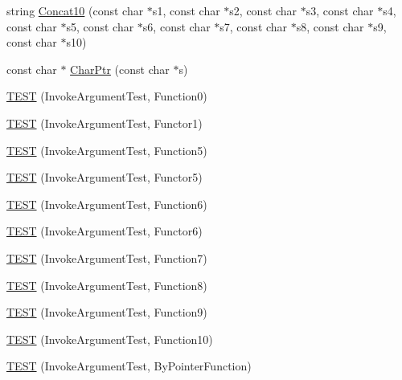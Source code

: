 \begin{DoxyCompactItemize}
string \hyperlink{namespacetesting_1_1gmock__generated__actions__test_ae90b9884fe6a44fa67c323c4f2f46d4f}{Concat10} (const char $\ast$s1, const char $\ast$s2, const char $\ast$s3, const char $\ast$s4, const char $\ast$s5, const char $\ast$s6, const char $\ast$s7, const char $\ast$s8, const char $\ast$s9, const char $\ast$s10)
\item 
const char $\ast$ \hyperlink{namespacetesting_1_1gmock__generated__actions__test_aa0f16da563ba1f4dd15c8a4fd9048fd3}{Char\+Ptr} (const char $\ast$s)
\item 
\hyperlink{namespacetesting_1_1gmock__generated__actions__test_aee4ab8d88ec59a7e3b91d919a6ed34da}{T\+E\+ST} (Invoke\+Argument\+Test, Function0)
\item 
\hyperlink{namespacetesting_1_1gmock__generated__actions__test_a47d12c8e504971d1f1c17df8d90bff82}{T\+E\+ST} (Invoke\+Argument\+Test, Functor1)
\item 
\hyperlink{namespacetesting_1_1gmock__generated__actions__test_a6afe3cf31ef3f5a9d6fd6af05c9de95c}{T\+E\+ST} (Invoke\+Argument\+Test, Function5)
\item 
\hyperlink{namespacetesting_1_1gmock__generated__actions__test_aab59917791fb297d6735d46e9a862be1}{T\+E\+ST} (Invoke\+Argument\+Test, Functor5)
\item 
\hyperlink{namespacetesting_1_1gmock__generated__actions__test_ae3f8bdac5c2ea1cf56ff1484ebb9a44e}{T\+E\+ST} (Invoke\+Argument\+Test, Function6)
\item 
\hyperlink{namespacetesting_1_1gmock__generated__actions__test_a789c7e8ee88243dc4a53841f6a8da3c6}{T\+E\+ST} (Invoke\+Argument\+Test, Functor6)
\item 
\hyperlink{namespacetesting_1_1gmock__generated__actions__test_a3e13c2ccf384c80c66116418e1b3ccde}{T\+E\+ST} (Invoke\+Argument\+Test, Function7)
\item 
\hyperlink{namespacetesting_1_1gmock__generated__actions__test_a5d583a32b46a306139d32ea9a1d575a9}{T\+E\+ST} (Invoke\+Argument\+Test, Function8)
\item 
\hyperlink{namespacetesting_1_1gmock__generated__actions__test_a3a278f02e1633feda3dea30d810a49ea}{T\+E\+ST} (Invoke\+Argument\+Test, Function9)
\item 
\hyperlink{namespacetesting_1_1gmock__generated__actions__test_afe4653b181e199417b004c4485152010}{T\+E\+ST} (Invoke\+Argument\+Test, Function10)
\item 
\hyperlink{namespacetesting_1_1gmock__generated__actions__test_ac3ff9db96cb7a664ef44d20eb0a7a71f}{T\+E\+ST} (Invoke\+Argument\+Test, By\+Pointer\+Function)

\end{DoxyCompactItemize}
